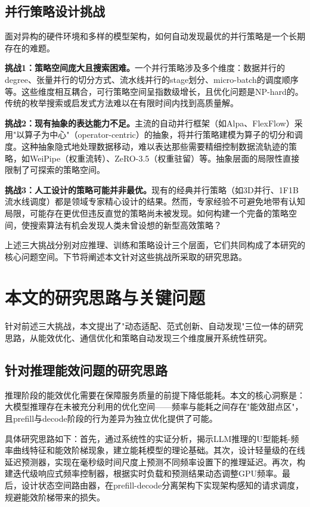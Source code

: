 \subsection{并行策略设计挑战}

面对异构的硬件环境和多样的模型架构，如何自动发现最优的并行策略是一个长期存在的难题。

\textbf{挑战1：策略空间庞大且搜索困难。}一个并行策略涉及多个维度：数据并行的degree、张量并行的切分方式、流水线并行的stage划分、micro-batch的调度顺序等。这些维度相互耦合，可行策略空间呈指数级增长，且优化问题是NP-hard的\cite{liu2024aceso}。传统的枚举搜索或启发式方法难以在有限时间内找到高质量解。

\textbf{挑战2：现有抽象的表达能力不足。}主流的自动并行框架（如Alpa、FlexFlow）采用"以算子为中心"（operator-centric）的抽象，将并行策略建模为算子的切分和调度\cite{zheng2022alpa}。这种抽象隐式地处理数据移动，难以表达那些需要精细控制数据流轨迹的策略，如WeiPipe（权重流转）、ZeRO-3.5（权重驻留）等。抽象层面的局限性直接限制了可探索的策略空间。

\textbf{挑战3：人工设计的策略可能并非最优。}现有的经典并行策略（如3D并行、1F1B流水线调度）都是领域专家精心设计的结果。然而，专家经验不可避免地带有认知局限，可能存在更优但违反直觉的策略尚未被发现。如何构建一个完备的策略空间，使搜索算法有机会发现人类未曾设想的新型高效策略？

上述三大挑战分别对应推理、训练和策略设计三个层面，它们共同构成了本研究的核心问题空间。下节将阐述本文针对这些挑战所采取的研究思路。

\section{本文的研究思路与关键问题}

针对前述三大挑战，本文提出了"动态适配、范式创新、自动发现"三位一体的研究思路，从能效优化、通信优化和策略自动发现三个维度展开系统性研究。

\subsection{针对推理能效问题的研究思路}

推理阶段的能效优化需要在保障服务质量的前提下降低能耗。本文的核心洞察是：大模型推理存在未被充分利用的优化空间——频率与能耗之间存在"能效甜点区"，且prefill与decode阶段的行为差异为独立优化提供了可能。

具体研究思路如下：首先，通过系统性的实证分析，揭示LLM推理的U型能耗-频率曲线特征和能效阶梯现象，建立能耗模型的理论基础。其次，设计轻量级的在线延迟预测器，实现在毫秒级时间尺度上预测不同频率设置下的推理延迟。再次，构建迭代级响应式频率控制器，根据实时负载和预测结果动态调整GPU频率。最后，设计状态空间路由器，在prefill-decode分离架构下实现架构感知的请求调度，规避能效阶梯带来的损失。

